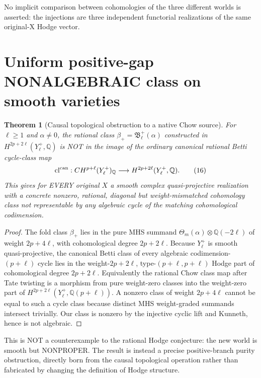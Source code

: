 \documentclass[11pt]{article}
\newtheorem{theorem}{Theorem}
\begin{document}
No implicit comparison between cohomologies of the three
different worlds is asserted: the injections are three
independent functorial realizations of the same original-X
Hodge vector.

\section{Uniform positive-gap NONALGEBRAIC class on smooth varieties}
\begin{theorem}[Causal topological obstruction to a native Chow source]
For $\ell\ge1$ and $\alpha\ne0$, the rational class
$\beta_+=\mathfrak B^+_{\ell}(\alpha)$ constructed in
$H^{2p+2\ell}(Y^+_\ell,\mathbb Q)$ is NOT in the image
of the ordinary canonical rational Betti cycle-class map
\[
 \mathrm{cl}^{\rm can}:
 CH^{p+\ell}(Y^+_\ell)_{\mathbb Q}
       \longrightarrow H^{2p+2\ell}(Y^+_\ell,\mathbb Q).
 \tag{16}
\]
This gives for EVERY original $X$ a smooth complex
quasi-projective realization with a concrete nonzero,
rational, diagonal but weight-mismatched cohomology class
not representable by any algebraic cycle of the matching
cohomological codimension.
\end{theorem}
\begin{proof}
The fold class $\beta_+$ lies in the pure MHS summand
$\Theta_m(\alpha)\otimes\mathbb Q(-2\ell)$ of weight
$2p+4\ell$, with cohomological degree $2p+2\ell$.
Because $Y^+_\ell$ is smooth quasi-projective,
the canonical Betti class of every algebraic
codimension-$(p+\ell)$ cycle lies in the
weight-$2p+2\ell$, type-$(p+\ell,p+\ell)$
Hodge part of cohomological degree $2p+2\ell$.
Equivalently the rational Chow class map after
Tate twisting is a morphism from pure weight-zero
classes into the weight-zero part of
$H^{2p+2\ell}(Y^+_\ell,\mathbb Q(p+\ell))$.
A nonzero class of weight $2p+4\ell$ cannot
be equal to such a cycle class because distinct
MHS weight-graded summands intersect trivially.
Our class is nonzero by the injective cyclic
lift and Kunneth, hence is not algebraic.
\end{proof}
This is NOT a counterexample to the rational Hodge
conjecture: the new world is smooth but NONPROPER.
The result is instead a precise positive-branch
purity obstruction, directly born from the causal
topological operation rather than fabricated by
changing the definition of Hodge structure.
\end{document}
